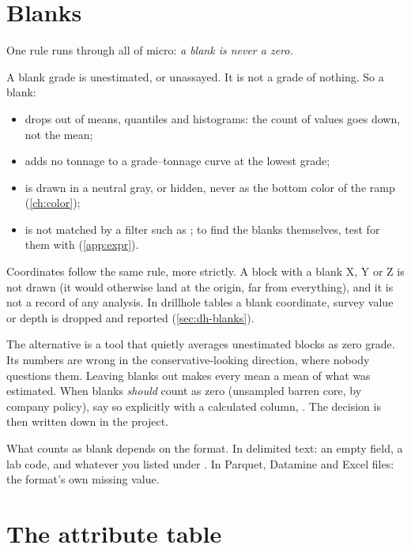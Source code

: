 \section{Blanks}\label{sec:columns-blanks}

One rule runs through all of micro: \emph{a blank is never a zero.}

A blank grade is unestimated, or unassayed. It is not a grade of nothing. So a blank:

\begin{itemize}
\item drops out of means, quantiles and histograms: the count of values goes down, not the mean;
\item adds no tonnage to a grade–tonnage curve at the lowest grade;
\item is drawn in a neutral gray, or hidden, never as the bottom color of the ramp (\cref{ch:color});
\item is not matched by a filter such as ; to find the blanks themselves, test for them with  (\cref{app:expr}).
\end{itemize}

Coordinates follow the same rule, more strictly. A block with a blank X, Y or Z is not drawn (it would otherwise land at the origin, far from everything), and it is not a record of any analysis. In drillhole tables a blank coordinate, survey value or depth is dropped and reported (\cref{sec:dh-blanks}).

\begin{why}
The alternative is a tool that quietly averages unestimated blocks as zero grade. Its numbers are wrong in the conservative-looking direction, where nobody questions them. Leaving blanks out makes every mean a mean of what was estimated. When blanks \emph{should} count as zero (unsampled barren core, by company policy), say so explicitly with a calculated column, . The decision is then written down in the project.
\end{why}

What counts as blank depends on the format. In delimited text: an empty field, a lab code, and whatever you listed under . In Parquet, Datamine and Excel files: the format's own missing value.

\section{The attribute table}\label{sec:columns-attrtable}


